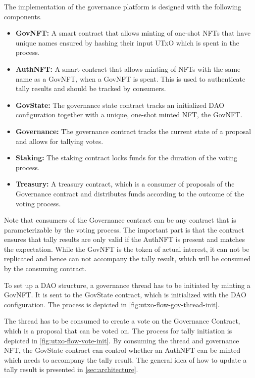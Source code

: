 \documentclass[11pt]{article}
\begin{document}
The implementation of the governance platform is designed with the following components.
\begin{itemize}
    \item \textbf{GovNFT:} A smart contract that allows minting of one-shot NFTs that have unique names ensured by hashing their input UTxO which is spent in the process.
    \item \textbf{AuthNFT:} A smart contract that allows minting of NFTs with the same name as a GovNFT, when a GovNFT is spent. This is used to authenticate tally results and should be tracked by consumers.
    \item \textbf{GovState:} The governance state contract tracks an initialized DAO configuration together with a unique, one-shot minted NFT, the GovNFT.
    \item \textbf{Governance:} The governance contract tracks the current state of a proposal and allows for tallying votes.
    \item \textbf{Staking:} The staking contract locks funds for the duration of the voting process.
    \item \textbf{Treasury:} A treasury contract, which is a consumer of proposals of the Governance contract and distributes funds according to the outcome of the voting process.
\end{itemize}

Note that consumers of the Governance contract can be any contract that is parameterizable by the voting process.
The important part is that the contract ensures that tally results are only valid if the AuthNFT is present and matches the expectation.
While the GovNFT is the token of actual interest, it can not be replicated and hence can not accompany the tally result, which will be consumed by the consuming contract.

To set up a DAO structure, a governance thread has to be initiated by minting a GovNFT.
It is sent to the GovState contract, which is initialized with the DAO configuration.
The process is depicted in \cref{fig:utxo-flow-gov-thread-init}.

The thread has to be consumed to create a vote on the Governance Contract, which is a proposal that can be voted on.
The process for tally initiation is depicted in \cref{fig:utxo-flow-vote-init}.
By consuming the thread and governance NFT, the GovState contract can control whether an AuthNFT can be minted which needs to accompany the tally result. 
The general idea of how to update a tally result is presented in \cref{sec:architecture}.
\end{document}
